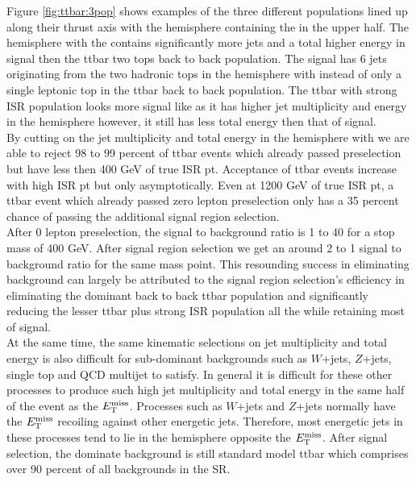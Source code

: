\indent Figure \ref{fig:ttbar:3pop} shows examples of the three different populations lined up along their thrust axis with the hemisphere containing the \MET in the upper half.  The hemisphere with the \MET contains significantly more jets and a total higher energy in signal then the ttbar two tops back to back population.  The signal has 6 jets originating from the two hadronic tops in the hemisphere with \MET instead of only a single leptonic top in the ttbar back to back population.   The ttbar with strong ISR population looks more signal like as it has higher jet multiplicity and energy in the \MET hemisphere however, it still has less total energy then that of signal. \\

\indent By cutting on the jet multiplicity and total energy in the hemisphere with \MET we are able to reject 98 to 99 percent of ttbar events which already passed preselection but have less then 400 GeV of true ISR pt.  Acceptance of ttbar events increase with high ISR pt but only asymptotically.  Even at 1200 GeV of true ISR pt, a ttbar event which already passed zero lepton preselection only has a 35 percent chance of passing the additional signal region selection.  \\

\indent After 0 lepton preselection, the signal to background ratio is 1 to 40 for a stop mass of 400 GeV.  After signal region selection we get an around 2 to 1 signal to background ratio for the same mass point.  This resounding success in eliminating background can largely be attributed to the signal region selection's efficiency in eliminating the dominant back to back ttbar population and significantly reducing the lesser ttbar plus strong ISR population all the while retaining most of signal. \\

\indent At the same time, the same kinematic selections on jet multiplicity and total energy is also difficult for sub-dominant backgrounds such as $W$+jets, $Z$+jets, single top and QCD multijet to satisfy.  In general it is difficult for these other processes to produce such high jet multiplicity and total energy in the same half of the event as the $E_{\mathrm{T}}^{\mathrm{miss}}$.   Processes such as $W$+jets and $Z$+jets normally have the $E_{\mathrm{T}}^{\mathrm{miss}}$ recoiling against other energetic jets.  Therefore, most energetic jets in these processes tend to lie in the hemisphere opposite the $E_{\mathrm{T}}^{\mathrm{miss}}$.  After signal selection, the dominate background is still standard model ttbar which comprises over 90 percent of all backgrounds in the SR.

